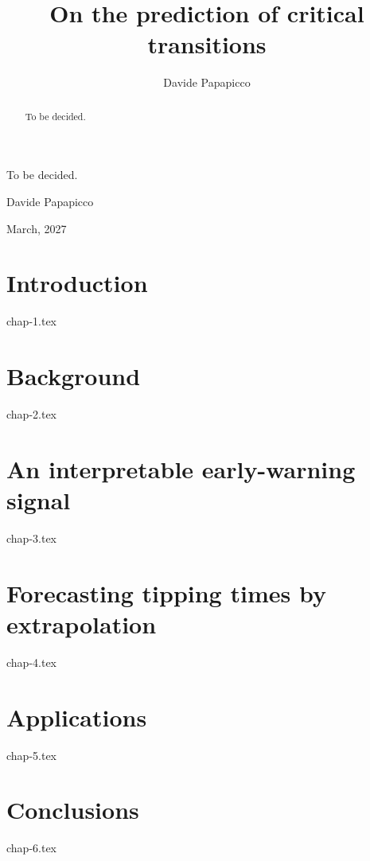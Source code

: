 \documentclass[a4paper,12pt,print]{style}
\title{On the prediction of critical transitions}
\author{Davide Papapicco}
\begin{document}
\maketitle

\frontmatter

\begin{abstract}
\noindent
To be decided.
\end{abstract}

\begin{acknowledgements}
To be decided.

\begin{flushright}
  Davide Papapicco

  March, 2027
\end{flushright}
\end{acknowledgements}

\setcounter{tocdepth}{1}
\tableofcontents

\mainmatter

\chapter{Introduction}\label{chap:introduction}
{chap-1.tex}

\chapter{Background}\label{chap:background}
{chap-2.tex}

\chapter{An interpretable early-warning signal}\label{chap:interpretable}
{chap-3.tex}

\chapter{Forecasting tipping times by extrapolation}\label{chap:forecasting}
{chap-4.tex}

\chapter{Applications}\label{chap:applications}
{chap-5.tex}

\chapter{Conclusions}\label{chap:conclusions}
{chap-6.tex}

\backmatter
\printbibliography[heading=bibintoc]
\end{document}
